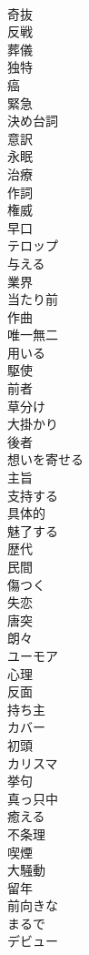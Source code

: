 \documentclass[8pt]{extreport}
\begin{document}
\begin{CJK}{UTF8}{min}
\\	奇抜
\\	反戦
\\	葬儀
\\	独特
\\	癌
\\	緊急
\\	決め台詞
\\	意訳
\\	永眠
\\	治療
\\	作詞
\\	権威
\\	早口
\\	テロップ
\\	与える
\\	業界
\\	当たり前
\\	作曲
\\	唯一無二
\\	用いる
\\	駆使
\\	前者
\\	草分け
\\	大掛かり
\\	後者
\\	想いを寄せる
\\	主旨
\\	支持する
\\	具体的
\\	魅了する
\\	歴代
\\	民間
\\	傷つく
\\	失恋
\\	唐突
\\	朗々
\\	ユーモア
\\	心理
\\	反面
\\	持ち主
\\	カバー
\\	初頭
\\	カリスマ
\\	挙句
\\	真っ只中
\\	癒える
\\	不条理
\\	喫煙
\\	大騒動
\\	留年
\\	前向きな
\\	まるで
\\	デビュー

\end{CJK}
\end{document}
